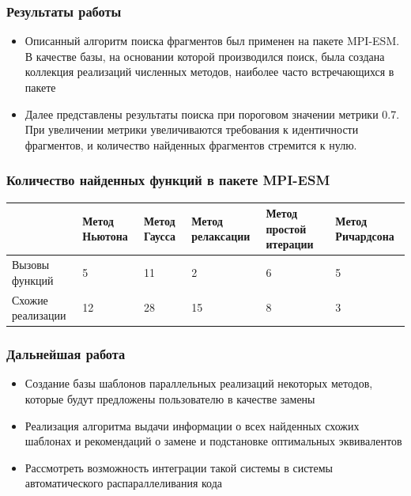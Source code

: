 \documentclass{beamer}
\begin{document}
\begin{frame}
\frametitle{Результаты работы}
\begin{itemize}
	\item Описанный алгоритм поиска фрагментов был применен на пакете MPI-ESM. В
качестве базы, на основании которой производился поиск, была создана коллекция реализаций численных методов, наиболее часто встречающихся в пакете
	\item Далее представлены результаты поиска при пороговом значении метрики 0.7. При увеличении метрики увеличиваются требования к идентичности фрагментов, и количество найденных фрагментов стремится к нулю.
\end{itemize}
\end{frame}

\begin{frame}
\frametitle{Количество найденных функций в пакете MPI-ESM}
\begin{small}
\begin{center}
\renewcommand{\arraystretch}{1.8} %
\begin{tabular}{|p{1.6cm}|p{1.4cm}|p{1.0cm}|p{1.3cm}|p{1.5cm}|p{1.9cm}|}
\hline
 & Метод Ньютона &  Метод Гаусса & Метод релаксации & Метод простой итерации & Метод Ричардсона\\
\hline
Вызовы 
\newline функций & 5 & 11 & 2 & 6 & 5 \\
\hline
Схожие 
\newline реализации & 12 & 28 & 15 & 8 & 3\\
\hline
\end{tabular}
\end{center}
\end{small}
\end{frame}

\begin{frame}
\frametitle{Дальнейшая работа}
\begin{itemize}
	\item[\textbullet] Создание базы шаблонов параллельных реализаций некоторых методов, которые будут предложены пользователю в качестве замены 
	\item[\textbullet] Реализация алгоритма выдачи информации о всех найденных схожих шаблонах и рекомендаций о замене и подстановке оптимальных эквивалентов	
	\item[\textbullet] Рассмотреть возможность интеграции такой системы в системы автоматического распараллеливания кода
\end{itemize}
\end{frame}
\end{document}
